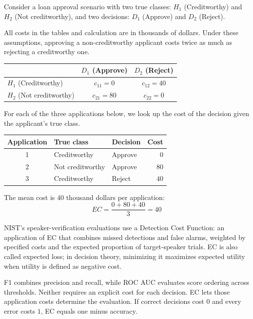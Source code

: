 {\metricsecondary\setlength{\tabcolsep}{5pt}Consider a loan approval scenario with two true classes: $H_1$ (Creditworthy) and $H_2$ (Not creditworthy), and two decisions: $D_1$ (Approve) and $D_2$ (Reject).

All costs in the tables and calculation are in thousands of dollars. Under these assumptions, approving a non-creditworthy applicant costs twice as much as rejecting a creditworthy one.

\begin{metricfigure}
\begin{tabular}{@{}lcc@{}}
\toprule
 & $D_1$ (Approve) & $D_2$ (Reject) \\
\midrule
$H_1$ (Creditworthy) & $c_{11} = 0$ & $c_{12} = 40$ \\
$H_2$ (Not creditworthy) & $c_{21} = 80$ & $c_{22} = 0$ \\
\bottomrule
\end{tabular}
\end{metricfigure}

For each of the three applications below, we look up the cost of the decision given the applicant's true class.

\begin{metricfigure}
\begin{tabular}{@{}cllr@{}}
\toprule
Application & True class & Decision & Cost \\
\midrule
1 & Creditworthy & Approve & $0$ \\
2 & Not creditworthy & Approve & $80$ \\
3 & Creditworthy & Reject & $40$ \\
\bottomrule
\end{tabular}
\end{metricfigure}

The mean cost is $40$ thousand dollars per application:
\[
EC = \frac{0 + 80 + 40}{3} = 40
\]

}
{
    NIST's speaker-verification evaluations use a Detection Cost Function: an application of EC that combines missed detections and false alarms, weighted by specified costs and the expected proportion of target-speaker trials. EC is also called expected loss; in decision theory, minimizing it maximizes expected utility when utility is defined as negative cost.
}

\metricsecondary

F1 combines precision and recall, while ROC AUC evaluates score ordering across thresholds. Neither requires an explicit cost for each decision. EC lets those application costs determine the evaluation. If correct decisions cost $0$ and every error costs $1$, EC equals one minus accuracy.
\metricend
